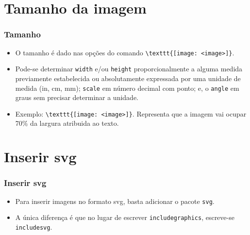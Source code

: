\documentclass[brazilian]{beamer}
\begin{document}
\section{Tamanho da imagem}
\begin{frame}[fragile]
    \frametitle{Tamanho}

    \begin{itemize}
        \item O tamanho é dado nas opções do comando \lstinline[style=myStyleLatex]!\texttt{[image: <image>]}!.
        \item Pode-se determinar \texttt{width} e/ou \texttt{height} proporcionalmente a alguma medida previamente estabelecida ou absolutamente expressada por uma unidade de medida (in, cm, mm); \texttt{scale} em número decimal com ponto; e, o \texttt{angle} em graus sem precisar determinar a unidade.
        \item Exemplo: \lstinline[style=myStyleLatex]!\texttt{[image: <image>]}!. Representa que a imagem vai ocupar 70\% da largura atribuida ao texto.
    \end{itemize}

\end{frame}

\section{Inserir svg}
\begin{frame}
    \frametitle{Inserir svg}

    \begin{itemize}
        \item Para inserir imagens no formato svg, basta adicionar o pacote \texttt{svg}.
        \item A única diferença é que no lugar de escrever \texttt{includegraphics}, escreve-se \texttt{includesvg}.
    \end{itemize}

\end{frame}
\end{document}
